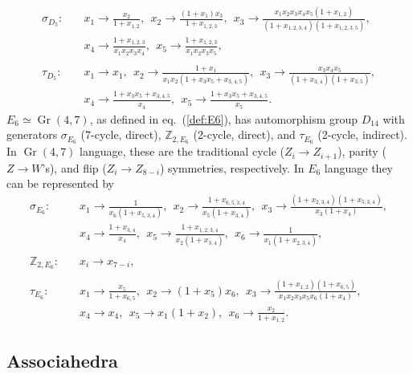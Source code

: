 \documentclass[11pt]{article}
\DeclareMathOperator{\Gr}{Gr}
\begin{document}
\begin{equation}
\begin{split}
  \sigma_{D_5}:\quad& 
    x_1\to \frac{x_2}{1+x_{1,2}},~~
    x_2\to \frac{(1+x_1) x_3}{1+x_{1,2,3}},~~
    x_3\to \frac{x_1 x_2 x_3 x_4 x_5 (1+x_{1,2})}{(1+x_{1,2,3,4}) (1+x_{1,2,3,5})},\\&
    x_4\to \frac{1+x_{1,2,3}}{x_1 x_2 x_3 x_4},~~
    x_5\to \frac{1+x_{1,2,3}}{x_1 x_2 x_3 x_5},\\ \\
  \tau_{D_5}:\quad& 
    x_1\to x_1,~~
    x_2\to \frac{1+x_1}{x_1 x_2 (1+x_3 x_5+x_{3,4,5})},~~
    x_3\to \frac{x_3 x_4 x_5}{(1+x_{3,4}) (1+x_{3,5})},\\&
    x_4\to \frac{1+x_3 x_5+x_{3,4,5}}{x_4},~~
    x_5\to \frac{1+x_3 x_5+x_{3,4,5}}{x_5}.
\end{split}  
\end{equation}
$E_6 \simeq \Gr(4,7)$, as defined in eq.~(\ref{def:E6}), has automorphism group $D_{14}$ with generators $\sigma_{E_6}$ (7-cycle, direct), $\mathbb{Z}_{2,E_6}$ (2-cycle, direct), and $\tau_{E_6}$ (2-cycle, indirect). In $\Gr(4,7)$ language, these are the traditional cycle ($Z_i \to Z_{i+1}$), parity ($Z \to W$'s), and flip ($Z_i \to Z_{8-i}$) symmetries, respectively. In $E_6$ language they can be represented by 
\begin{equation}
\begin{split}
  \sigma_{E_6}:\quad& 
    x_1\to \frac{1}{x_6 (1+x_{5,3,4})},~~
    x_2\to \frac{1+x_{6,5,3,4}}{x_5 (1+x_{3,4})},~~
    x_3\to \frac{(1+x_{2,3,4}) (1+x_{5,3,4})}{x_3 (1+x_4)},\\&
    x_4\to \frac{1+x_{3,4}}{x_4},~~
    x_5\to \frac{1+x_{1,2,3,4}}{x_2 (1+x_{3,4})},~~
    x_6\to \frac{1}{x_1 (1+x_{2,3,4})},\\ \\
  \mathbb{Z}_{2,E_6}:\quad& 
    x_i\to x_{7-i},\\ \\
  \tau_{E_6}:\quad& 
    x_1\to \frac{x_5}{1+x_{6,5}},~~
    x_2\to (1+x_5) x_6,~~
    x_3\to \frac{(1+x_{1,2}) (1+x_{6,5})}{x_1 x_2 x_3 x_5 x_6 (1+x_4)},\\&
    x_4\to x_4,~~
    x_5\to x_1 (1+x_2),~~
    x_6\to \frac{x_2}{1+x_{1,2}}.
\end{split}  
\end{equation}

\subsection{Associahedra}
\end{document}
